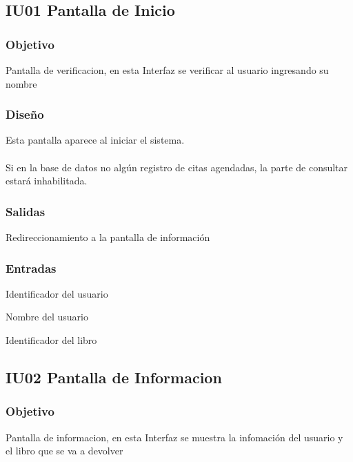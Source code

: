 \newpage
\subsection{IU01 Pantalla de Inicio}

\subsubsection{Objetivo}
	Pantalla de verificacion, en esta Interfaz se verificar al usuario ingresando su nombre  

\subsubsection{Diseño}
	Esta pantalla aparece al iniciar el sistema.  \\\\
	Si en la base de datos no algún registro de citas agendadas, la parte de consultar estará inhabilitada. 


\subsubsection{Salidas}
	\begin{Citemize}
		\item Redireccionamiento a la pantalla de información  
	\end{Citemize}
	
\subsubsection{Entradas}
	\begin{Citemize}
	\item Identificador del usuario
		\item Nombre del usuario 
		\item Identificador del libro
	\end{Citemize}

\subsection{IU02 Pantalla de Informacion}

\subsubsection{Objetivo}
	Pantalla de informacion, en esta Interfaz se muestra la infomación del usuario y el libro que se va a devolver  

